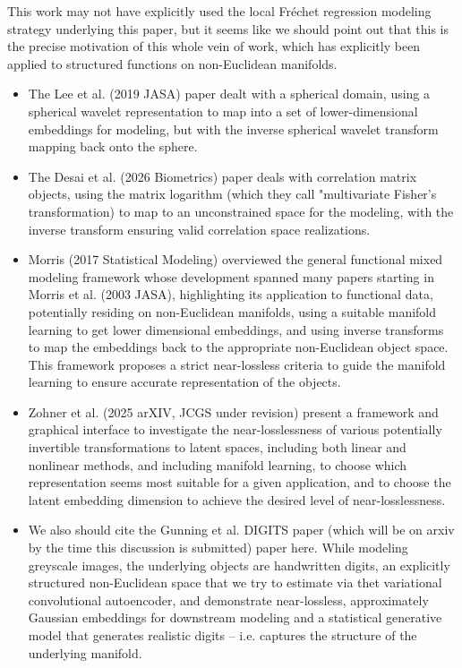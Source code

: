 \begin{itemize}
    This work may not have explicitly used the local Fr\'echet regression modeling strategy underlying this paper, but it seems like we should point out that this is the precise motivation of this whole vein of work, which has explicitly been applied to structured functions on non-Euclidean manifolds.
    \begin{itemize}
        \item The Lee et al. (2019 JASA) paper dealt with a spherical domain, using a spherical wavelet representation to map into a set of lower-dimensional embeddings for modeling, but with the inverse spherical wavelet transform mapping back onto the sphere.
        \item The Desai et al. (2026 Biometrics) paper deals with correlation matrix objects, using the matrix logarithm (which they call "multivariate Fisher's transformation) to map to an unconstrained space for the modeling, with the inverse transform ensuring valid correlation space realizations.
        \item Morris (2017 Statistical Modeling) overviewed the general functional mixed modeling framework whose development spanned many papers starting in Morris et al. (2003 JASA), highlighting its application to functional data, potentially residing on non-Euclidean manifolds, using a suitable manifold learning to get lower dimensional embeddings, and using inverse transforms to map the embeddings back to the appropriate non-Euclidean object space.  This framework proposes a strict near-lossless criteria to guide the manifold learning to ensure accurate representation of the objects.
        \item Zohner et al. (2025 arXIV, JCGS under revision) present a framework and graphical interface to investigate the near-losslessness of various potentially invertible transformations to latent spaces, including both linear and nonlinear methods, and including manifold learning, to choose which representation seems most suitable for a given application, and to choose the latent embedding dimension to achieve the desired level of near-losslessness.
        \item We also should cite the Gunning et al. DIGITS paper (which will be on arxiv by the time this discussion is submitted) paper here.  While modeling greyscale images, the underlying objects are handwritten digits, an explicitly structured non-Euclidean space that we try to estimate via thet variational convolutional autoencoder, and demonstrate near-lossless, approximately Gaussian embeddings for downstream modeling and a statistical generative model that generates realistic digits -- i.e. captures the structure of the underlying manifold.
    \end{itemize}
\end{itemize}